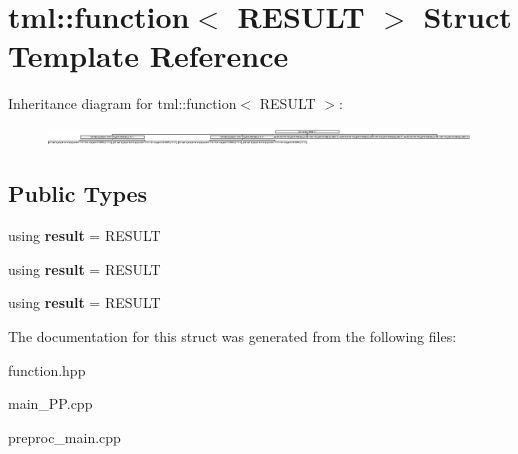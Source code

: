 \hypertarget{structtml_1_1function}{\section{tml\+:\+:function$<$ R\+E\+S\+U\+L\+T $>$ Struct Template Reference}
\label{structtml_1_1function}
}
Inheritance diagram for tml\+:\+:function$<$ R\+E\+S\+U\+L\+T $>$\+:\begin{figure}[H]
\begin{center}
\leavevmode
\includegraphics[height=0.462428cm]{structtml_1_1function}
\end{center}
\end{figure}
\subsection*{Public Types}
\begin{DoxyCompactItemize}
\item 
\hypertarget{structtml_1_1function_a8c4d7302397a7d0081d386313fa78d9b}{using {\bfseries result} = R\+E\+S\+U\+L\+T}\label{structtml_1_1function_a8c4d7302397a7d0081d386313fa78d9b}

\item 
\hypertarget{structtml_1_1function_a8c4d7302397a7d0081d386313fa78d9b}{using {\bfseries result} = R\+E\+S\+U\+L\+T}\label{structtml_1_1function_a8c4d7302397a7d0081d386313fa78d9b}

\item 
\hypertarget{structtml_1_1function_a8c4d7302397a7d0081d386313fa78d9b}{using {\bfseries result} = R\+E\+S\+U\+L\+T}\label{structtml_1_1function_a8c4d7302397a7d0081d386313fa78d9b}

\end{DoxyCompactItemize}


The documentation for this struct was generated from the following files\+:\begin{DoxyCompactItemize}
\item 
function.\+hpp\item 
main\+\_\+\+P\+P.\+cpp\item 
preproc\+\_\+main.\+cpp\end{DoxyCompactItemize}
